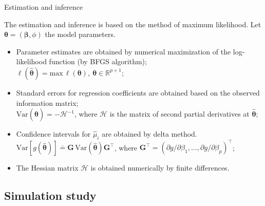 \documentclass[11pt]{beamer}\usepackage[]{graphicx}\usepackage[]{color}
\begin{document}
\begin{frame}{Estimation and inference}

  The estimation and inference is based on the method of maximum
  likelihood. Let $\bm{\theta} = (\bm{\beta}, \phi)$ the model
  parameters. \vspace{0.2cm}
  \begin{itemize}
  \item Parameter estimates are obtained by numerical maximization of
    the log-likelihood function (by BFGS algorithm);\\[0.1cm]
    $\ell(\hat{\bm{\theta}}) =
    \text{max}\,\ell(\bm{\theta}),\:
    \bm{\theta} \in \mathbb{R}^{p+1}$;
    \vspace{0.2cm}
  \item Standard errors for regression coefficients are obtained based
    on the observed information matrix;\\[0.1cm]
    $\text{Var}(\hat{\bm{\theta}}) = -\mathcal{H}^{-1}$, where
    $\mathcal{H}$ is the matrix of second partial derivatives at
    $\hat{\bm{\theta}}$; \vspace{0.2cm}
  \item Confidence intervals for $\hat{\mu}_i$ are obtained by delta
    method.\\[0.1cm]
    $\text{Var}[g(\hat{\bm{\theta}})] \doteq \bm{G}\,
    \text{Var}(\hat{\bm{\theta}}) \bm{G}^\top $,
    where
    $\bm{G}^\top = (\partial g / \partial \beta_1,
    \ldots, \partial g / \partial \beta_p)^\top$;
  \item The Hessian matrix $\mathcal{H}$ is obtained numerically by
    finite differences.
  \end{itemize}
\end{frame}

\subsection{Simulation study}
\end{document}
